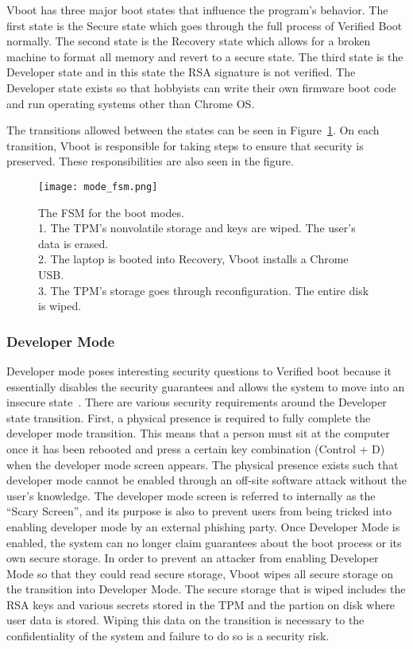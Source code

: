 \documentclass[../report.tex]{subfiles}
\begin{document}
Vboot has three major boot states that influence the program's behavior.
The first state is the Secure state which goes through the full process of Verified Boot normally.
The second state is the Recovery state which allows for a broken machine to
format all memory and revert to a secure state.
The third state is the Developer state and in this state the RSA signature is not verified.
The Developer state exists so that hobbyists can write their own firmware boot code and run operating systems other than Chrome OS\@.

The transitions allowed between the states can be seen in
Figure~\ref{fig:mode_fsm}.
On each transition, Vboot is responsible for taking steps to ensure that
security is preserved. 
These responsibilities are also seen in the figure.

\begin{figure}
  \centering
  \texttt{[image: mode\_fsm.png]}
  \caption{The FSM for the boot modes. \\
  1. The TPM's nonvolatile storage and keys are wiped. The user's data
  is erased. \\
  2. The laptop is booted into Recovery, Vboot installs a Chrome USB.
  \\
  3. The TPM's storage goes through reconfiguration. The entire disk is wiped.
  \\}\label{fig:mode_fsm}
\end{figure}

\subsubsection{Developer Mode}

Developer mode poses interesting security questions to Verified boot because it essentially disables the security guarantees and allows the system to move into an insecure state~\cite{developer-mode}. 
There are various security requirements around the Developer state transition.
First, a physical presence is required to fully complete the developer mode transition. 
This means that a person must sit at the computer once it has been rebooted and press a certain key combination (Control + D) when the developer mode screen appears.
The physical presence exists such that developer mode cannot be enabled through an off-site software attack without the user's knowledge.
The developer mode screen is referred to internally as the ``Scary Screen'', and its purpose is also to prevent users from being tricked into enabling developer mode by an external phishing party.
Once Developer Mode is enabled, the system can no longer claim guarantees about the boot process or its own secure storage.
In order to prevent an attacker from enabling Developer Mode so that they could read secure storage, Vboot wipes all secure storage on the transition into Developer Mode.
The secure storage that is wiped includes the RSA keys and various secrets stored in the TPM and the partion on disk where user data is stored.
Wiping this data on the transition is necessary to the confidentiality of the system and failure to do so is a security risk.
\end{document}
